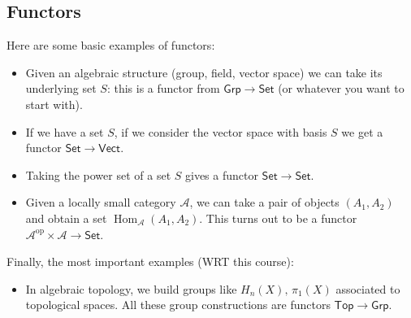 \subsection{Functors}
\begin{example}
   Here are some basic examples of functors:
   \begin{itemize}
       \item Given an algebraic structure (group, field, vector space) we can take its underlying set $S$: this is a functor from $\mathsf{Grp}\to \mathsf{Set}$ (or whatever you want to start with).
       \item If we have a set $S$, if we consider the vector space with basis $S$ we get a functor $\mathsf{Set} \to \mathsf{Vect}$.
       \item Taking the power set of a set $S$ gives a functor $\mathsf{Set}\to \mathsf{Set}$.
       \item Given a locally small category $\mathcal{A}$, we can take a pair of objects $(A_1,A_2)$ and obtain a set $\operatorname{Hom}_{\mathcal{A}}(A_1,A_2)$. This turns out to be a functor $\mathcal{A}^{\text{op}}\times \mathcal{A}\to \mathsf{Set}$.
   \end{itemize}
   Finally, the most important examples (WRT this course):
   \begin{itemize}
       \item In algebraic topology, we build groups like $H_n(X),\, \pi_1(X)$ associated to topological spaces. All these group constructions are functors $\mathsf{Top} \to \mathsf{Grp}$.
   \end{itemize}
\end{example}
